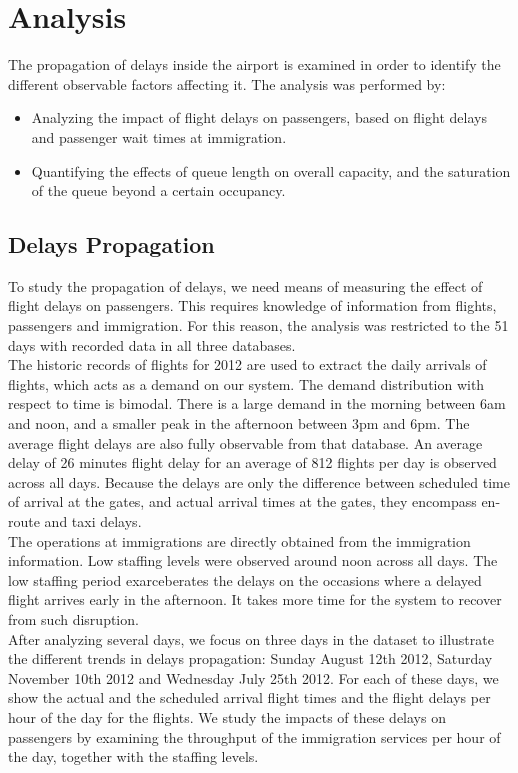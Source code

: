 \documentclass[11pt,onecolumn]{IEEEtran}
\begin{document}
\section{Analysis}
The propagation of delays inside the airport is examined in order to identify the different observable factors affecting it.
The analysis was performed by:
\begin{itemize}
\item Analyzing the impact of flight delays on passengers, based on flight delays  and passenger wait times at immigration.
\item Quantifying the effects of queue length on overall capacity, and the saturation of the queue beyond a certain occupancy.
\end{itemize}

\subsection{Delays Propagation}
To study the propagation of delays, we need means of measuring the effect of flight delays on passengers. This requires knowledge of information from flights, passengers and immigration. For this reason, the analysis was restricted to the 51 days with recorded data in all three databases.\\
The historic records of flights for 2012 are used to extract the daily arrivals of flights, which acts as a demand on our system. The demand distribution with respect to time is bimodal.
There is a large demand in the morning between 6am and noon, and a smaller peak in the afternoon between 3pm and 6pm. 
The average flight delays are also fully observable from that database.
An average delay of 26 minutes flight delay for an average of 812 flights per day is observed across  all days. Because the delays are only the difference between scheduled time of arrival at the gates, and actual arrival times at the gates, they encompass en-route and taxi delays.\\
The operations at immigrations are directly obtained from the immigration information. Low staffing levels were observed around noon across all days.
The low staffing period exarceberates the delays on the occasions where a delayed flight arrives early in the afternoon. It takes more time for the system to recover from such disruption. \\
After analyzing several days, we focus on three days in the dataset to illustrate the different trends in delays propagation: Sunday August 12th 2012, Saturday November 10th 2012 and Wednesday July 25th 2012.
For each of these days, we show the actual and the scheduled arrival flight times and the flight delays per hour of the day for the flights. We study the impacts of these delays on passengers by examining the throughput of the immigration services per hour of the day, together with the staffing levels.
\newpage
\end{document}
